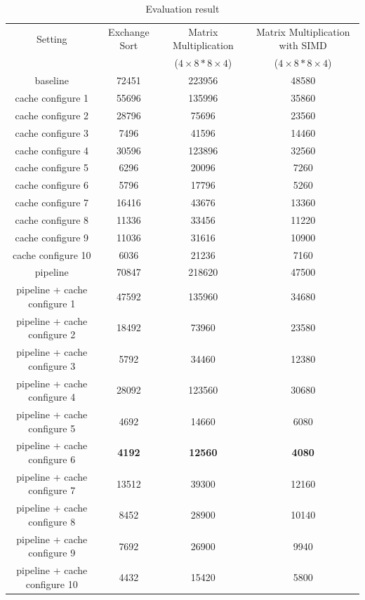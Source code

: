 \documentclass{sig-alternate}
\begin{document}
\begin{table}[t]
\caption{Evaluation result}
\label{tab:res}
\centering
\begin{tabular}{|c|c|c|c|}
\hline
 Setting & Exchange Sort & Matrix Multiplication  & Matrix Multiplication with SIMD\\

 & & ($4\times8 * 8 \times 4$) & ($4\times8 * 8 \times 4$) \\ \hline
baseline & 72451 & 223956 & 48580 \\
\hline
cache configure 1& 55696 & 135996 & 35860 \\
\hline
cache configure 2 & 28796 & 75696 & 23560\\
\hline
cache configure 3 & 7496& 41596& 14460\\
\hline
cache configure 4 & 30596& 123896& 32560\\
\hline
cache configure 5& 6296& 20096 & 7260 \\
\hline
cache configure 6 & 5796 & 17796 & 5260 \\
\hline
cache configure 7 & 16416 & 43676 & 13360\\
\hline
cache configure 8 & 11336 & 33456 & 11220\\
\hline
cache configure 9 & 11036 & 31616 & 10900 \\
\hline
cache configure 10 & 6036 & 21236 & 7160 \\
\hline
pipeline &70847 & 218620 & 47500 \\
\hline
pipeline + cache configure 1 & 47592 & 135960 & 34680\\
\hline 
pipeline + cache configure 2 & 18492 & 73960 & 23580\\
\hline
pipeline + cache configure 3 & 5792 & 34460 & 12380\\
\hline
pipeline + cache configure 4 & 28092 & 123560 & 30680\\
\hline
pipeline + cache configure 5 & 4692 & 14660 & 6080\\
\hline 
pipeline + cache configure 6 & \textbf{4192}& \textbf{12560} & \textbf{4080}\\
\hline
pipeline + cache configure 7 & 13512& 39300& 12160\\
\hline
pipeline + cache configure 8 & 8452& 28900& 10140\\
\hline
pipeline + cache configure 9 & 7692& 26900& 9940\\
\hline
pipeline + cache configure 10 & 4432& 15420& 5800\\
\hline
\end{tabular}
\end{table}
\end{document}
